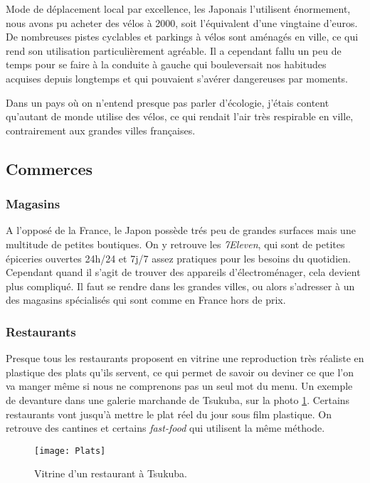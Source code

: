 \documentclass[11pt,journal]{RapportFR}
\begin{document}
\begin{CJK*}{UTF8}{min}
Mode de d\'eplacement local par excellence, les Japonais l'utilisent \'enormement, nous avons pu acheter des v\'elos \`a 2000\textyen, soit l'\'equivalent d'une vingtaine d'euros. De nombreuses pistes cyclables et parkings \`a v\'elos sont am\'enag\'es en ville, ce qui rend son utilisation particuli\`erement agr\'eable. Il a cependant fallu un peu de temps pour se faire \`a la conduite \`a gauche qui bouleversait nos habitudes acquises depuis longtemps et qui pouvaient s'av\'erer dangereuses par moments.

Dans un pays o\`u on n'entend presque pas parler d'\'ecologie, j'\'etais content qu'autant de monde utilise des v\'elos, ce qui rendait l'air tr\`es respirable en ville, contrairement aux grandes villes fran\c{c}aises.


\subsection{Commerces}

\subsubsection{Magasins}

A l'oppos\'e de la France, le Japon poss\`ede tr\'es peu de grandes surfaces mais une multitude de petites boutiques. On y retrouve les \textit{7Eleven}, qui sont de petites \'epiceries ouvertes 24h/24 et 7j/7 assez pratiques pour les besoins du quotidien.
Cependant quand il s'agit de trouver des appareils d'\'electrom\'enager, cela devient plus compliqu\'e. Il faut se rendre dans les grandes villes, ou alors s'adresser \`a un des magasins sp\'ecialis\'es qui sont comme en France hors de prix.

\subsubsection{Restaurants}

Presque tous les restaurants proposent en vitrine une reproduction tr\`es r\'ealiste en plastique des plats qu'ils servent, ce qui permet de savoir ou deviner ce que l'on va manger m\^eme si nous ne comprenons pas un seul mot du menu. Un exemple de devanture dans une galerie marchande de Tsukuba, sur la photo \ref{fig_plats}. Certains restaurants vont jusqu'\`a mettre le plat r\'eel du jour sous film plastique. On retrouve des cantines et certains \textit{fast-food} qui utilisent la m\^eme m\'ethode.


\begin{figure}[!t]
\centering
\texttt{[image: Plats]}
\caption{Vitrine d'un restaurant \`a Tsukuba.}
\label{fig_plats}
\end{figure}


\end{CJK*}
\end{document}
